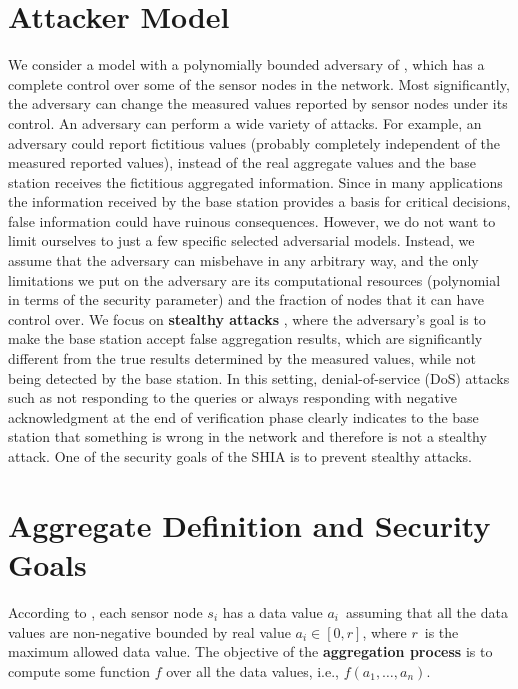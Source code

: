\section{Attacker Model}
	
	We consider a model with a polynomially bounded adversary of \cite{przydatek2003sia}, which has a complete control over some of the sensor nodes in the network.
	Most significantly, the adversary can change the measured values reported by sensor nodes under its control.
	An adversary can perform a wide variety of attacks.
	For example, an adversary could report fictitious values (probably completely independent of the measured reported values), instead of the real aggregate values and the base station receives the fictitious aggregated information. 
	Since in many applications the information received by the base station provides a basis for critical decisions, false information could have ruinous consequences.
	However, we do not want to limit ourselves to just a few specific selected adversarial models. 
	Instead, we assume that the adversary can misbehave in any arbitrary way, and the only limitations we put on the adversary are its computational resources (polynomial in terms of the security parameter) and the fraction of nodes that it can have control over. 
	We focus on \textbf{stealthy attacks} \cite{przydatek2003sia}, where the adversary's goal is to make the base station accept false aggregation results, which are significantly different from the true results determined by the measured values, while not being detected by the base station.
	In this setting, denial-of-service (DoS) attacks such as not responding to the queries or always responding with negative acknowledgment at the end of verification phase clearly indicates to the base station that something is wrong in the network and therefore is not a stealthy attack.
	One of the security goals of the SHIA is to prevent stealthy attacks.
	
\section{Aggregate Definition and Security Goals}
	
	\begin{definition}
		According to \cite{chan2006secure}, each sensor node $s_{i}$ has a data value $a_{i}$\ assuming that all the data values are non-negative bounded by real value $a_{i} \in [0,r]$, where $r$\ is the maximum allowed data value.
		The objective of the \textbf{aggregation process} is to compute some function $f$ over all the data values, i.e., $f (a_{1}, \dotsc ,a_{n})$.
	\end{definition}

